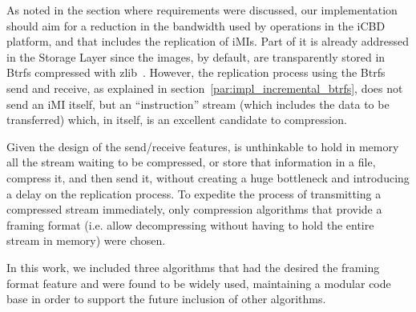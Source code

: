 
As noted in the section where requirements were discussed, our implementation should aim for a reduction in the bandwidth used by operations in the iCBD platform, and that includes the replication of iMIs. Part of it is already addressed in the Storage Layer since the images, by default, are transparently stored in Btrfs compressed with zlib~\cite{btrfs_compression}. However, the replication process using the Btrfs send and receive, as explained in section~\ref{par:impl_incremental_btrfs}, does not send an iMI itself, but an “instruction” stream (which includes the data to be transferred) which, in itself, is an excellent candidate to compression.

Given the design of the send/receive features, is unthinkable to hold in memory all the stream waiting to be compressed, or store that information in a file, compress it, and then send it, without creating a huge bottleneck and introducing a delay on the replication process. To expedite the process of transmitting a compressed stream immediately, only compression algorithms that provide a framing format (i.e. allow decompressing without having to hold the entire stream in memory) were chosen.

In this work, we included three algorithms that had the desired the framing format feature and were found to be widely used, maintaining a modular code base in order to support the future inclusion of other algorithms.


